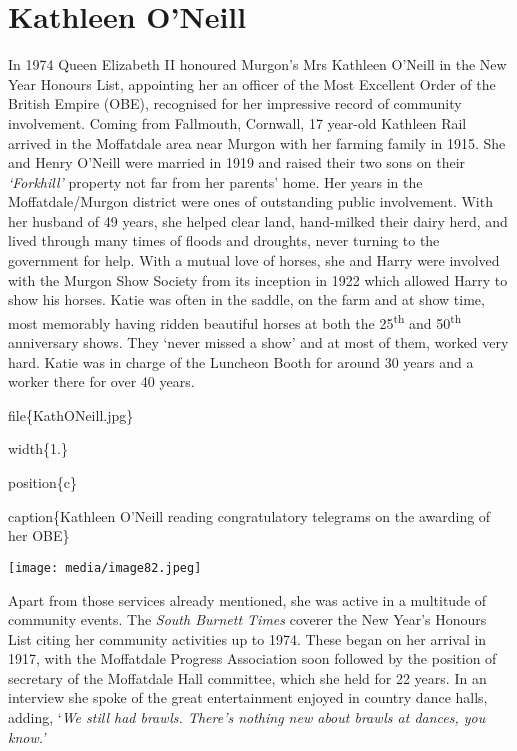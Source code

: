 \hypertarget{kathleen-oneill}{%
\section{Kathleen O'Neill}\label{kathleen-oneill}}

In 1974 Queen Elizabeth II honoured Murgon's Mrs Kathleen O'Neill in the New Year Honours List, appointing her an officer of the Most Excellent Order of the British Empire (OBE), recognised for her impressive record of community involvement. Coming from Fallmouth, Cornwall, 17 year-old Kathleen Rail arrived in the Moffatdale area near Murgon with her farming family in 1915. She and Henry O'Neill were married in 1919 and raised their two sons on their \emph{`Forkhill'} property not far from her parents' home. Her years in the Moffatdale/Murgon district were ones of outstanding public involvement. With her husband of 49 years, she helped clear land, hand-milked their dairy herd, and lived through many times of floods and droughts, never turning to the government for help. With a mutual love of horses, she and Harry were involved with the Murgon Show Society from its inception in 1922 which allowed Harry to show his horses. Katie was often in the saddle, on the farm and at show time, most memorably having ridden beautiful horses at both the 25\textsuperscript{th} and 50\textsuperscript{th} anniversary shows. They `never missed a show' and at most of them, worked very hard. Katie was in charge of the Luncheon Booth for around 30 years and a worker there for over 40 years.

file\{KathONeill.jpg\}

width\{1.\}

position\{c\}

caption\{Kathleen O'Neill reading congratulatory telegrams on the awarding of her OBE\}

\texttt{[image: media/image82.jpeg]}

Apart from those services already mentioned, she was active in a multitude of community events. The \emph{South Burnett Times} coverer the New Year's Honours List citing her community activities up to 1974. These began on her arrival in 1917, with the Moffatdale Progress Association soon followed by the position of secretary of the Moffatdale Hall committee, which she held for 22 years. In an interview she spoke of the great entertainment enjoyed in country dance halls, adding, `\emph{We still had brawls. There's nothing new about brawls at dances, you know.'}

